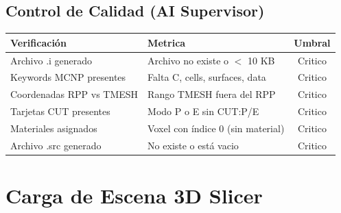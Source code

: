 \documentclass[12pt,a4paper]{article}
\begin{document}
\begin{tcolorbox}[aiSupervisor]

\begin{tcolorbox}[aiSupervisor]
\subsection*{Control de Calidad (AI Supervisor)}

\begin{table}[H]
\centering
\begin{tabular}{llc}
\toprule
\textbf{Verificación} & \textbf{Metrica} & \textbf{Umbral} \\
\midrule
Archivo .i generado & Archivo no existe o $<$ 10 KB & Critico \\
Keywords MCNP presentes & Falta C, cells, surfaces, data & Critico \\
Coordenadas RPP vs TMESH & Rango TMESH fuera del RPP & Critico \\
Tarjetas CUT presentes & Modo P o E sin CUT:P/E & Critico \\
Materiales asignados & Voxel con índice 0 (sin material) & Critico \\
Archivo .src generado & No existe o está vacio & Critico \\
\bottomrule
\end{tabular}
\end{table}

\newpage


\newpage


\newpage


\newpage

\end{tcolorbox}
\end{tcolorbox}
\section{Carga de Escena 3D Slicer}
\label{sec:carga}
\end{document}
